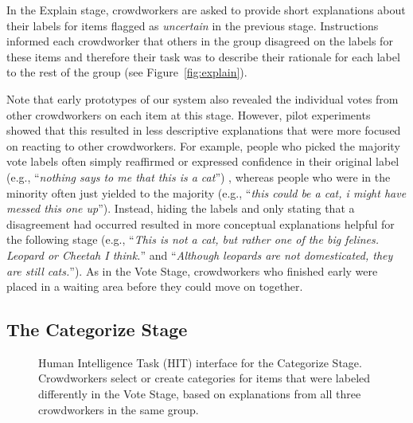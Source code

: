 In the Explain stage, crowdworkers are asked to provide short explanations about their labels for items flagged as \emph{uncertain} in the previous stage. Instructions informed each crowdworker that others in the group disagreed on the labels for these items and therefore their task was to describe their rationale for each label to the rest of the group (see Figure~\ref{fig:explain}). 

Note that early prototypes of our system also revealed the individual votes from other crowdworkers on each item at this stage. However, pilot experiments showed that this resulted in less descriptive explanations that were more focused on reacting to other crowdworkers. For example, people who picked the majority vote labels often simply reaffirmed or expressed confidence in their original label (e.g., ``\emph{nothing says to me that this is a cat}'') , whereas people who were in the minority often just yielded to the majority (e.g., ``\emph{this could be a cat, i might have messed this one up}''). Instead, hiding the labels and only stating that a disagreement had occurred resulted in more conceptual explanations helpful for the following stage (e.g., ``\emph{This is not a cat, but rather one of the big felines. Leopard or Cheetah I think.}'' and ``\emph{Although leopards are not domesticated, they are still cats.}''). As in the Vote Stage, crowdworkers who finished early were placed in a waiting area before they could move on together.


\subsection{The Categorize Stage}

\begin{figure}[ht]
	\centering
	\caption[HIT interface for the Categorize Stage of Revolt]{
	Human Intelligence Task (HIT) interface for the Categorize Stage. Crowdworkers select or create categories for items that were labeled differently in the Vote Stage, based on explanations from all three crowdworkers in the same group. 
	}
	\label{fig:categorize}
\end{figure}


